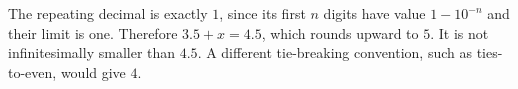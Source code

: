 The repeating decimal is exactly $1$, since its first $n$ digits have value $1-10^{-n}$ and their limit is one. Therefore $3.5+x=4.5$, which rounds upward to $\boxed 5$. It is not infinitesimally smaller than $4.5$. A different tie-breaking convention, such as ties-to-even, would give $4$.
